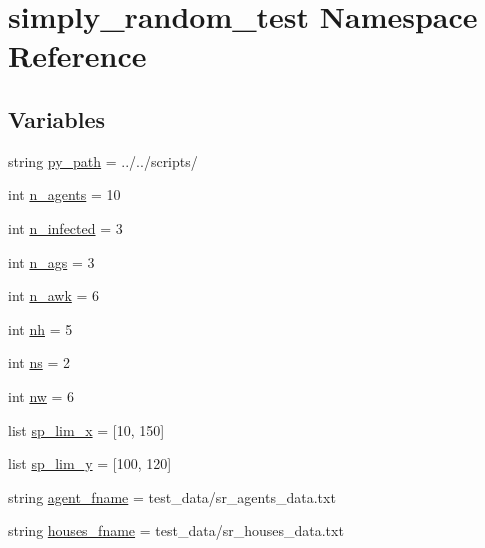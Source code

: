 \hypertarget{namespacesimply__random__test}{}\section{simply\+\_\+random\+\_\+test Namespace Reference}
\label{namespacesimply__random__test}
\subsection*{Variables}
\begin{DoxyCompactItemize}
\item 
string \hyperlink{namespacesimply__random__test_ad37a422d731faf59524770d57cbcef71}{py\+\_\+path} = \textquotesingle{}../../scripts/\textquotesingle{}
\item 
int \hyperlink{namespacesimply__random__test_a3edca84d8817fec0d32b3961e7318926}{n\+\_\+agents} = 10
\item 
int \hyperlink{namespacesimply__random__test_aad1ff8fb3223ecaa5bbf87ef55389e75}{n\+\_\+infected} = 3
\item 
int \hyperlink{namespacesimply__random__test_a4c5ec10906f41410e0b2bff7b06867c2}{n\+\_\+ags} = 3
\item 
int \hyperlink{namespacesimply__random__test_a9d3a13c924b50b533bafff8cbcb4a0fc}{n\+\_\+awk} = 6
\item 
int \hyperlink{namespacesimply__random__test_a89ebd6ab70c7a575410a639c38479ef3}{nh} = 5
\item 
int \hyperlink{namespacesimply__random__test_aaadbb482b374a0e6e4cdd0649b48b4b0}{ns} = 2
\item 
int \hyperlink{namespacesimply__random__test_a12d234a5bd8de5be2315e70e0ffc6a61}{nw} = 6
\item 
list \hyperlink{namespacesimply__random__test_a1c806d0f5e022c4b9b74de746357fd9a}{sp\+\_\+lim\+\_\+x} = \mbox{[}10, 150\mbox{]}
\item 
list \hyperlink{namespacesimply__random__test_a2d5440020dee89e6108b3f76fa963a19}{sp\+\_\+lim\+\_\+y} = \mbox{[}100, 120\mbox{]}
\item 
string \hyperlink{namespacesimply__random__test_a322bcb2eda616d1b52d78238a800f4e4}{agent\+\_\+fname} = \textquotesingle{}test\+\_\+data/sr\+\_\+agents\+\_\+data.\+txt\textquotesingle{}
\item 
string \hyperlink{namespacesimply__random__test_a62cb7d819c0715e47baacb1bbf5cad3a}{houses\+\_\+fname} = \textquotesingle{}test\+\_\+data/sr\+\_\+houses\+\_\+data.\+txt\textquotesingle{}

\end{DoxyCompactItemize}
